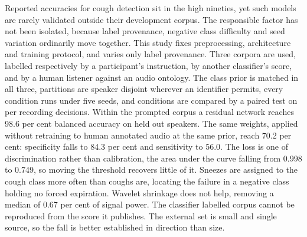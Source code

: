 Reported accuracies for cough detection sit in the high nineties, yet such
models are rarely validated outside their development corpus. The responsible factor has
not been isolated, because label provenance, negative class difficulty and seed variation
ordinarily move together. This study fixes preprocessing, architecture and training
protocol, and varies only label provenance. Three corpora are used, labelled respectively
by a participant's instruction, by another classifier's score, and by a human listener
against an audio ontology. The class prior is matched in all three, partitions are speaker
disjoint wherever an identifier permits, every condition runs under five seeds, and
conditions are compared by a paired test on per recording decisions. Within the prompted
corpus a residual network reaches 98.6 per cent balanced accuracy on held out speakers.
The same weights, applied without retraining to human annotated audio at the same prior,
reach 70.2 per cent: specificity falls to 84.3 per cent and sensitivity to 56.0. The loss
is one of discrimination rather than calibration, the area under the curve falling from
0.998 to 0.749, so moving the threshold recovers little of it. Sneezes are assigned to the
cough class more often than coughs are, locating the failure in a negative class holding
no forced expiration. Wavelet shrinkage does not help, removing a median of 0.67 per cent
of signal power. The classifier labelled corpus cannot be reproduced from the score it
publishes. The external set is small and single source, so the fall is better established
in direction than size.
